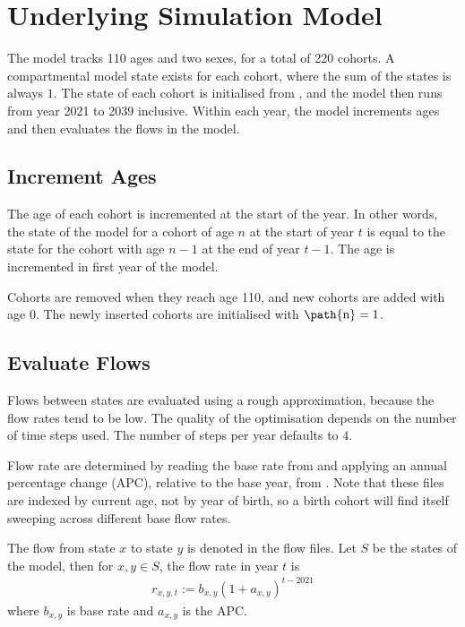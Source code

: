\documentclass[]{article}
\begin{document}
	\section{Underlying Simulation Model}
	
	The model tracks 110 ages and two sexes, for a total of 220 cohorts. A compartmental model state exists for each cohort, where the sum of the states is always $1$. The state of each cohort is initialised from , and the model then runs from year 2021 to 2039 inclusive. Within each year, the model increments ages and then evaluates the flows in the model.
	
	\subsection{Increment Ages}
	The age of each cohort is incremented at the start of the year. In other words, the state of the model for a cohort of age $n$ at the start of year $t$ is equal to the state for the cohort with age $n-1$ at the end of year $t-1$. The age is incremented in first year of the model.
	
	Cohorts are removed when they reach age 110, and new cohorts are added with age 0. The newly inserted cohorts are initialised with $\text{\path{n}} = 1$.
	
	\subsection{Evaluate Flows}
	
	Flows between states are evaluated using a rough approximation, because the flow rates tend to be low. The quality of the optimisation depends on the number of time steps used. The number of steps per year defaults to $4$.
	
	Flow rate are determined by reading the base rate from  and applying an annual percentage change (APC), relative to the base year, from . Note that these files are indexed by current age, not by year of birth, so a birth cohort will find itself sweeping across different base flow rates.
	
	The flow from state $x$ to state $y$ is denoted  in the flow files. Let $S$ be the states of the model, then for $x,y \in S$, the flow rate in year $t$ is
	\begin{align*}
		r_{x, y, t} := b_{x,y} (1 + a_{x,y})^{t - 2021}
	\end{align*}
	where $b_{x, y}$ is base rate and $a_{x,y}$ is the APC.
	
\end{document}
